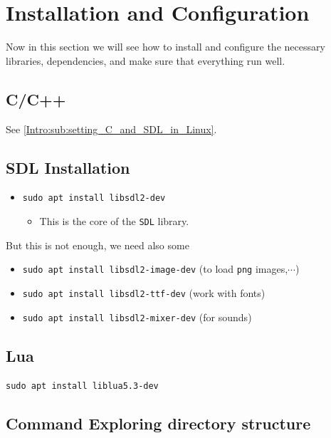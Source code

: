 \newpage
\section{Installation and Configuration}

Now in this section we will see how to install and configure the necessary libraries, dependencies, and make sure that everything run well.

\subsection{C/C++}

See \ref{Intro:sub:setting_C_and_SDL_in_Linux}.

\subsection{SDL Installation}

\begin{itemize}

\item \verb|sudo apt install libsdl2-dev|

    \begin{itemize}
        \item This is the core of the \verb|SDL| library.
    \end{itemize}

\end{itemize}

But this is not enough, we need also some 

\begin{itemize}

\item \verb|sudo apt install libsdl2-image-dev| (to load \verb|png| images,$\cdots$)

\item \verb|sudo apt install libsdl2-ttf-dev| (work with fonts)

\item \verb|sudo apt install libsdl2-mixer-dev| (for sounds)

\end{itemize}

\subsection{Lua}

\verb|sudo apt install liblua5.3-dev|

\subsection{Command Exploring directory structure}


